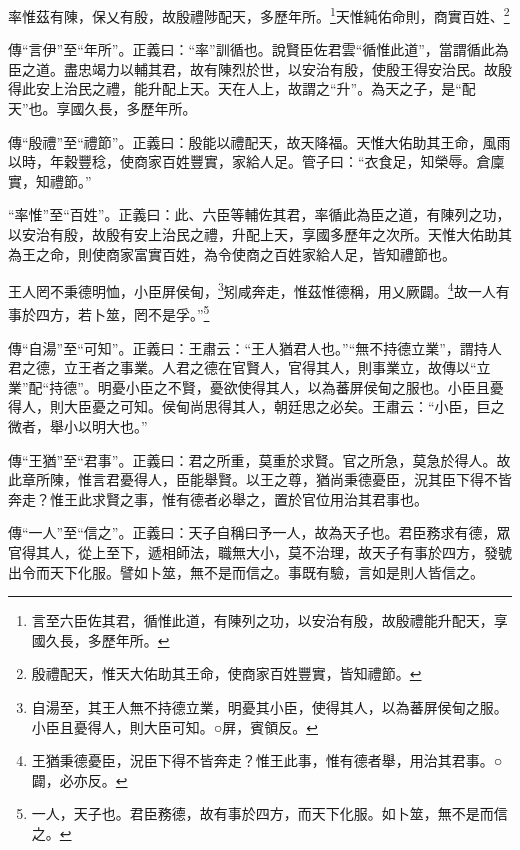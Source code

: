 率惟茲有陳，保乂有殷，故殷禮陟配天，多歷年所。\footnote{言至六臣佐其君，循惟此道，有陳列之功，以安治有殷，故殷禮能升配天，享國久長，多歷年所。}天惟純佑命則，商實百姓、\footnote{殷禮配天，惟天大佑助其王命，使商家百姓豐實，皆知禮節。}


{\noindent\zhuan{}\fzbyks 傳“言伊”至“年所”。正義曰：“率”訓循也。說賢臣佐君雲“循惟此道”，當謂循此為臣之道。盡忠竭力以輔其君，故有陳烈於世，以安治有殷，使殷王得安治民。故殷得此安上治民之禮，能升配上天。天在人上，故謂之“升”。為天之子，是“配天”也。享國久長，多歷年所。 \par}

{\noindent\zhuan{}\fzbyks 傳“殷禮”至“禮節”。正義曰：殷能以禮配天，故天降福。天惟大佑助其王命，風雨以時，年穀豐稔，使商家百姓豐實，家給人足。管子曰：“衣食足，知榮辱。倉廩實，知禮節。” \par}

{\noindent\shu{}\fzkt “率惟”至“百姓”。正義曰：此、六臣等輔佐其君，率循此為臣之道，有陳列之功，以安治有殷，故殷有安上治民之禮，升配上天，享國多歷年之次所。天惟大佑助其為王之命，則使商家富實百姓，為令使商之百姓家給人足，皆知禮節也。 \par}

王人罔不秉德明恤，小臣屏侯甸，\footnote{自湯至，其王人無不持德立業，明憂其小臣，使得其人，以為蕃屏侯甸之服。小臣且憂得人，則大臣可知。○屏，賓領反。}矧咸奔走，惟茲惟德稱，用乂厥闢。\footnote{王猶秉德憂臣，況臣下得不皆奔走？惟王此事，惟有德者舉，用治其君事。○闢，必亦反。}故一人有事於四方，若卜筮，罔不是孚。”\footnote{一人，天子也。君臣務德，故有事於四方，而天下化服。如卜筮，無不是而信之。}


{\noindent\zhuan{}\fzbyks 傳“自湯”至“可知”。正義曰：王肅云：“王人猶君人也。”“無不持德立業”，謂持人君之德，立王者之事業。人君之德在官賢人，官得其人，則事業立，故傳以“立業”配“持德”。明憂小臣之不賢，憂欲使得其人，以為蕃屏侯甸之服也。小臣且憂得人，則大臣憂之可知。侯甸尚思得其人，朝廷思之必矣。王肅云：“小臣，巨之微者，舉小以明大也。” \par}

{\noindent\zhuan{}\fzbyks 傳“王猶”至“君事”。正義曰：君之所重，莫重於求賢。官之所急，莫急於得人。故此章所陳，惟言君憂得人，臣能舉賢。以王之尊，猶尚秉德憂臣，況其臣下得不皆奔走？惟王此求賢之事，惟有德者必舉之，置於官位用治其君事也。 \par}

{\noindent\zhuan{}\fzbyks 傳“一人”至“信之”。正義曰：天子自稱曰予一人，故為天子也。君臣務求有德，眾官得其人，從上至下，遞相師法，職無大小，莫不治理，故天子有事於四方，發號出令而天下化服。譬如卜筮，無不是而信之。事既有驗，言如是則人皆信之。 \par}

